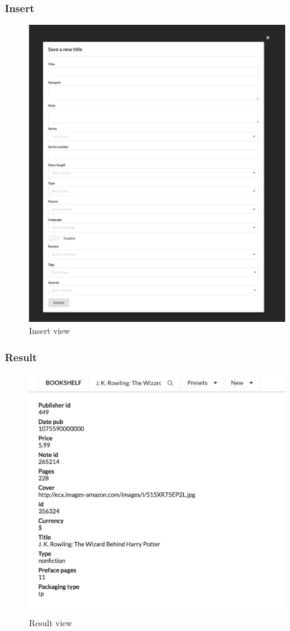 \documentclass[doubleside, titlepage]{article}
\begin{document}
\subsubsection{Insert}
\begin{figure}[!htb]
	\centering
    \includegraphics[scale = 0.25]{ui-insert}
    \caption{Insert view}
\end{figure}

\subsubsection{Result}
\begin{figure}[!htb]
	\centering
    \includegraphics[scale = 0.5]{ui-result}
    \caption{Result view}
\end{figure}
\end{document}
